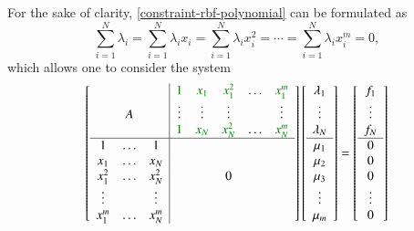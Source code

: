 \documentclass[12pt]{report} %
\begin{document}
For the sake of clarity, \eqref{constraint-rbf-polynomial} can be formulated
as
\[ \sum_{i = 1}^N \lambda_i = \sum_{i = 1}^N \lambda_i x_i = \sum_{i = 1}^N \lambda_i
  x^2_i = \cdots = \sum_{i = 1}^N \lambda_i x^m_i = 0, \]
which allows one to consider the system
\[ \left[\begin{array}{ccc|ccccc}
                                  &        &                             & {\color[HTML]{008000}1} & {\color[HTML]{008000}x_1} &
      {\color[HTML]{008000}x_1^2} & \ldots & {\color[HTML]{008000}x_1^m}                                                                            \\
                                  & A      &                             & \vdots                  & \vdots                    & \vdots &  & \vdots \\
                                  &        &                             & {\color[HTML]{008000}1} & {\color[HTML]{008000}x_N} &
      {\color[HTML]{008000}x_N^2} & \ldots & {\color[HTML]{008000}x_N^m}                                                                            \\ \hline
      1                           & \ldots & 1                           &                         &                           &        &  &        \\
      x_1                         & \ldots & x_N                         &                         &                           &        &  &        \\
      x_1^2                       & \ldots & x_N^2                       &                         &                           & 0      &  &        \\
      \vdots                      &        & \vdots                      &                         &                           &        &  &        \\
      x_1^m                       & \ldots & x_N^m                       &                         &                           &        &  &
    \end{array}\right] \left[\begin{array}{c}
      \lambda_1 \\
      \vdots    \\
      \lambda_N \\
      \hline
      \mu_1     \\
      \mu_2     \\
      \mu_3     \\
      \vdots    \\
      \mu_m
    \end{array}\right] = \left[\begin{array}{c}
      f_1    \\
      \vdots \\
      f_N    \\
      \hline
      0      \\
      0      \\
      0      \\
      \vdots \\
      0
    \end{array}\right] \]
\end{document}
